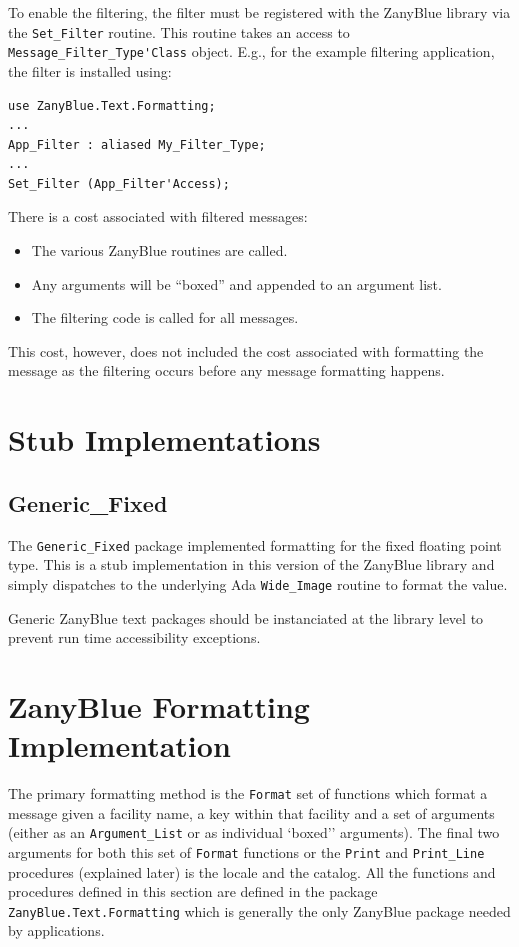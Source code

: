 To enable the filtering, the filter must be registered with the ZanyBlue
library via the \verb|Set_Filter| routine.  This routine takes an access to
\verb|Message_Filter_Type'Class| object.  E.g., for the example filtering
application, the filter is installed using:
\begin{xmpl}
\begin{verbatim}
use ZanyBlue.Text.Formatting;
...
App_Filter : aliased My_Filter_Type;
...
Set_Filter (App_Filter'Access);
\end{verbatim}
\end{xmpl}

There is a cost associated with filtered messages:
\begin{itemize}
\item The various ZanyBlue routines are called.
\item Any arguments will be ``boxed'' and appended to an argument list.
\item The filtering code is called for all messages.
\end{itemize}
This cost, however, does not included the cost associated with formatting
the message as the filtering occurs before any message formatting happens.

\section{Stub Implementations}
\subsection{Generic\_Fixed}

The \verb|Generic_Fixed| package implemented formatting for the fixed
floating point type.  This is a stub implementation in this version of
the ZanyBlue library and simply dispatches to the underlying
Ada \verb|Wide_Image| routine to format the value.

Generic ZanyBlue text packages should be instanciated at the library
level to prevent run time accessibility exceptions.

\section{ZanyBlue Formatting Implementation}

The primary formatting method is the \verb|Format| set of functions
which format a message given a facility name, a key within that
facility and a set of arguments (either as an \verb|Argument_List|
or as individual `boxed'' arguments).  The final two arguments for
both this set of \verb|Format| functions or the \verb|Print| and
\verb|Print_Line| procedures (explained later) is the locale
and the catalog.  All the functions and procedures defined in
this section are defined in the package \verb|ZanyBlue.Text.Formatting|
which is generally the only ZanyBlue package needed by applications.

